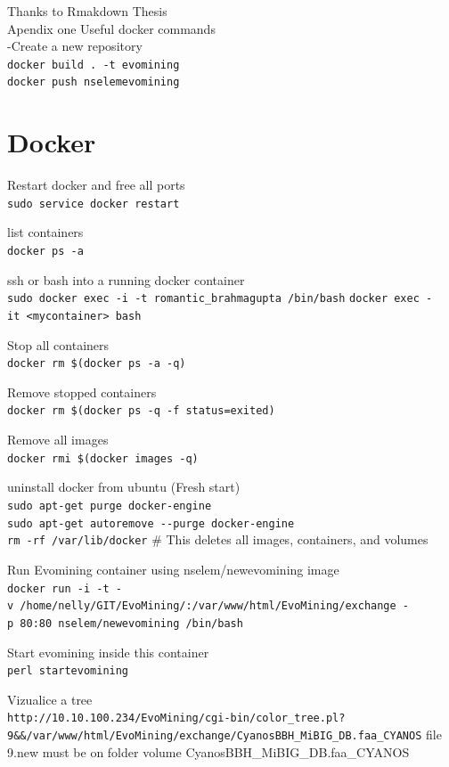 \documentclass[12pt,twoside]{reedthesis}
\begin{document}
{  Thanks to Rmakdown Thesis\\
  Apendix one Useful docker commands\\
  -Create a new repository\\
  \texttt{docker\ build\ .\ -t\ evomining}\\
  \texttt{docker\ push\ nselemevomining}
  
  \section{Docker}\label{docker}
  
  Restart docker and free all ports\\
  \texttt{sudo\ service\ docker\ restart}
  
  list containers\\
  \texttt{docker\ ps\ -a}
  
  ssh or bash into a running docker container\\
  \texttt{sudo\ docker\ exec\ -i\ -t\ romantic\_brahmagupta\ /bin/bash}
  \texttt{docker\ exec\ -it\ \textless{}mycontainer\textgreater{}\ bash}
  
  Stop all containers\\
  \texttt{docker\ rm\ \$(docker\ ps\ -a\ -q)}
  
  Remove stopped containers\\
  \texttt{docker\ rm\ \$(docker\ ps\ -q\ -f\ status=exited)}
  
  Remove all images\\
  \texttt{docker\ rmi\ \$(docker\ images\ -q)}
  
  uninstall docker from ubuntu (Fresh start)\\
  \texttt{sudo\ apt-get\ purge\ docker-engine}\\
  \texttt{sudo\ apt-get\ autoremove\ -\/-purge\ docker-engine}\\
  \texttt{rm\ -rf\ /var/lib/docker} \# This deletes all images,
  containers, and volumes
  
  Run Evomining container using nselem/newevomining image\\
  \texttt{docker\ run\ -i\ -t\ -v\ /home/nelly/GIT/EvoMining/:/var/www/html/EvoMining/exchange\ -p\ 80:80\ nselem/newevomining\ /bin/bash}
  
  Start evomining inside this container\\
  \texttt{perl\ startevomining}
  
  Vizualice a tree\\
  \texttt{http://10.10.100.234/EvoMining/cgi-bin/color\_tree.pl?9\&\&/var/www/html/EvoMining/exchange/CyanosBBH\_MiBIG\_DB.faa\_CYANOS}
  file 9.new must be on folder volume CyanosBBH\_MiBIG\_DB.faa\_CYANOS
  
}
\end{document}
